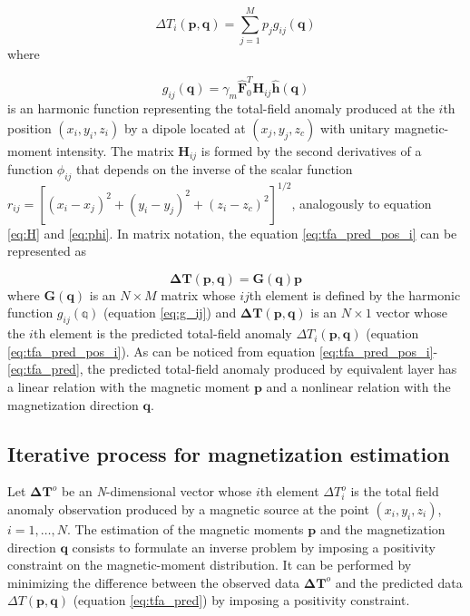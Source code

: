 \begin{equation}
\Delta T_i (\mathbf{p},\mathbf{q}) = \sum_{j=1}^{M} p_j g_{ij} (\mathbf{q})
\label{eq:tfa_pred_pos_i}
\end{equation}    
where 

\begin{equation}
g_{ij} (\mathbf{q})  = \gamma_m \hat{\mathbf{F}}_0^T \mathbf{H}_{ij} \hat{\mathbf{h}}(\mathbf{q})
\label{eq:g_ij}
\end{equation}
is an harmonic function representing the total-field anomaly produced at the $i$th position $(x_i,y_i,z_i)$ by a dipole located at $(x_j,y_j,z_c)$ with unitary magnetic-moment intensity. The matrix $\mathbf{H}_{ij}$ is formed by the second derivatives of a function $\phi_{ij}$ that depends on the inverse of the scalar function $r_{ij} = [(x_i-x_j)^2 + (y_i-y_j)^2 + (z_i-z_c)^2]^{1/2}$, analogously to equation \ref{eq:H} and \ref{eq:phi}. In matrix notation, the equation \ref{eq:tfa_pred_pos_i} can be represented as 

\begin{equation}
 \mathbf{\Delta T} (\mathbf{p}, \mathbf{q}) = \mathbf{G}(\mathbf{q}) \mathbf{p}
\label{eq:tfa_pred}
\end{equation}
where $\mathbf{G}(\mathbf{q})$ is an $N \times M$ matrix whose $ij$th element is defined by the harmonic function $g_{ij}(\mathbb{q})$ (equation \ref{eq:g_ij}) and $\mathbf{\Delta T} (\mathbf{p}, \mathbf{q})$ is an $N \times 1$ vector whose the $i$th element is the predicted total-field anomaly $\Delta T_i (\mathbf{p},\mathbf{q})$ (equation \ref{eq:tfa_pred_pos_i}). As can be noticed from equation \ref{eq:tfa_pred_pos_i}-\ref{eq:tfa_pred}, the predicted total-field anomaly produced by equivalent layer has a linear relation with the magnetic moment $\mathbf{p}$ and a nonlinear relation with the magnetization direction $\mathbf{q}$. 

\subsection{Iterative process for magnetization estimation}


Let $\mathbf{\Delta T}^o$ be an \textit{N}-dimensional vector whose $i$th element $\Delta T_i^o$ is the total field anomaly observation produced by a magnetic source at the point $(x_i,y_i,z_i)$, $i = 1, \ldots, N$. The estimation of the magnetic moments $\mathbf{p}$ and the magnetization direction $\mathbf{q}$ consists to formulate an inverse problem by imposing a positivity constraint on the magnetic-moment distribution. It can be performed by minimizing the difference between the observed data $\mathbf{\Delta T}^o$ and the predicted data $\Delta T (\mathbf{p}, \mathbf{q})$ (equation \ref{eq:tfa_pred}) by imposing a positivity constraint. 


